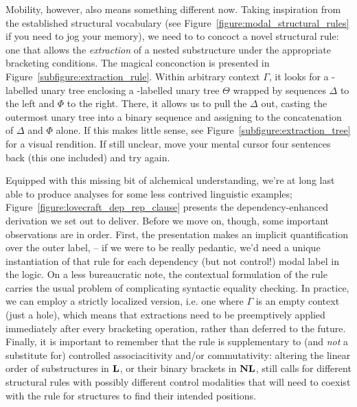 Mobility, however, also means something different now.
Taking inspiration from the established structural vocabulary (see Figure~\ref{figure:modal_structural_rules} if you need to jog your memory), we need to  to concoct a novel structural rule: one that allows the \textit{extraction} of a nested substructure under the appropriate bracketing conditions.
The magical conconction is presented in Figure~\ref{subfigure:extraction_rule}.
Within arbitrary context $\Gamma$, it looks for a -labelled unary tree enclosing a -labelled unary tree $\Theta$ wrapped by sequences $\Delta$ to the left and $\Phi$ to the right.
There, it allows us to pull the $\Delta$ out, casting the outermost unary tree into a binary sequence and assigning  to the concatenation of $\Delta$ and $\Phi$ alone. 
If this makes little sense, see Figure~\ref{subfigure:extraction_tree} for a visual rendition.
If still unclear, move your mental cursor four sentences back (this one included) and try again.

Equipped with this missing bit of alchemical understanding, we're at long last able to produce analyses for some less contrived linguistic examples; Figure~\ref{figure:lovecraft_dep_rep_clause} presents the dependency-enhanced derivation we set out to deliver.
Before we move on, though, some important observations are in order.
First, the presentation makes an implicit quantification over the outer label,  -- if we were to be really pedantic, we'd need a unique instantiation of that rule for each dependency (but not control!) modal label in the logic.
On a less bureaucratic note, the contextual formulation of the rule carries the usual problem of complicating syntactic equality checking. 
In practice, we can employ a strictly localized version, i.e. one where $\Gamma$ is an empty context (just a hole), which means that extractions need to be preemptively applied immediately after every bracketing operation, rather than deferred to the future.
Finally, it is important to remember that the rule is supplementary to (and \textit{not} a substitute for) controlled associacitivity and/or commutativity: altering the linear order of substructures in $\textbf{L}$, or their binary brackets in $\textbf{NL}$, still calls for different structural rules with possibly different control modalities that will need to coexist with the \Extraction{} rule for structures to find their intended positions.



